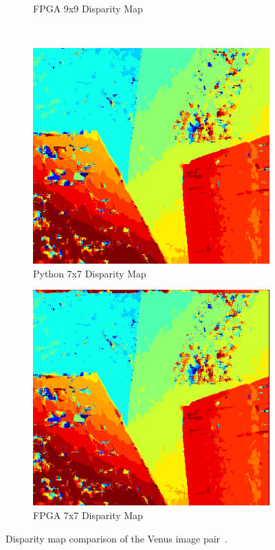 \begin{figure}
\begin{center}
\begin{subfigure}{0.45\textwidth}
		\caption{FPGA 9x9 Disparity Map}
		\label{fig:venusFPGA}
	\end{subfigure}
	\\
	\begin{subfigure}{0.45\textwidth}
		\includegraphics[width=\textwidth]{figures/venus_7x7_python3.png}
		\caption{Python 7x7 Disparity Map}
		\label{fig:venusPy}
	\end{subfigure}
	\begin{subfigure}{0.45\textwidth}
		\includegraphics[width=\textwidth]{figures/venus_7x7_fpga.png}
		\caption{FPGA 7x7 Disparity Map}
		\label{fig:venusFPGA}
	\end{subfigure}
	\captionfonts
	\caption{Disparity map comparison of the Venus image pair~\cite{middlebury}.}
	\label{fig:venusDispMap}
\end{center}
\end{figure}


